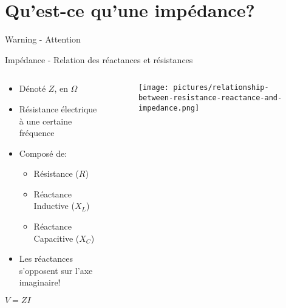 
\section{Qu'est-ce qu'une impédance?}

\begin{frame}{Warning - Attention}
\end{frame}

\begin{frame}{Impédance - Relation des réactances et résistances}
    \begin{columns}
        \begin{column}{0.5\textwidth}
            \begin{itemize}
                \item Dénoté $Z$, en $\Omega$
                \item Résistance électrique à une certaine fréquence
                \item Composé de:
                \begin{itemize}
                    \item Résistance ($R$)
                    \item Réactance Inductive ($X_L$)
                    \item Réactance Capacitive ($X_C$)
                \end{itemize}
                \item Les réactances s'opposent sur l'axe imaginaire!
            \end{itemize}
            \par
            \begin{center}
                \Large{$V = ZI$}
            \end{center}
        \end{column}
        
        \begin{column}{0.5\textwidth}
            \begin{figure}
                \centering
                \texttt{[image: pictures/relationship-between-resistance-reactance-and-impedance.png]}
            \end{figure}
        \end{column}
    \end{columns}
\end{frame}

